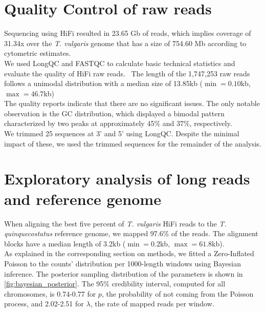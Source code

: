 \section*{Quality Control of raw reads}

Sequencing using \ac{HiFi} resulted in 23.65 Gb of reads, which implies coverage of 31.34x over the \textit{T. vulgaris} genome that has a size of 754.60 Mb according to cytometric estimates.~\cite{marieCytometricExercisePlant1993,PlantDNACvalues} \\

We used LongQC and FASTQC to calculate basic technical statistics and evaluate the quality of \ac{HiFi} raw reads.~\cite{fukasawaLongQCQualityControl2020,BabrahamBioinformaticsFastQC} The length of the 1,747,253 raw reads follows a unimodal distribution with a median size of 13.85kb ($\min = 0.10$kb, $\max = 46.7$kb) \\


The quality reports indicate that there are no significant issues. The only notable observation is the GC distribution, which displayed a bimodal pattern characterized by two peaks at approximately 45\% and 37\%, respectively.\\

We trimmed 25 sequences at 3' and 5' using LongQC. Despite the minimal impact of these, we used the trimmed sequences for the remainder of the analysis. \\

\section*{Exploratory analysis of long reads and reference genome}

When aligning the best five percent of \textit{T. vulgaris }\ac{HiFi} reads to the \textit{T. quinquecostatus} reference genome, we mapped 97.6\% of the reads. The alignment blocks have a median length of 3.2kb ($\min = 0.2$kb, $\max = 61.8$kb).\\


As explained in the corresponding section on methods, we fitted a Zero-Inflated Poisson to the counts' distribution per 1000-length windows using Bayesian inference. The posterior sampling distribution of the parameters is shown in \autoref{fig:bayesian_posterior}. The 95\% credibility interval, computed for all chromosomes, is 0.74-0.77 for $p$, the probability of not coming from the Poisson process, and 2.02-2.51 for $\lambda$, the rate of mapped reads per window. \\

